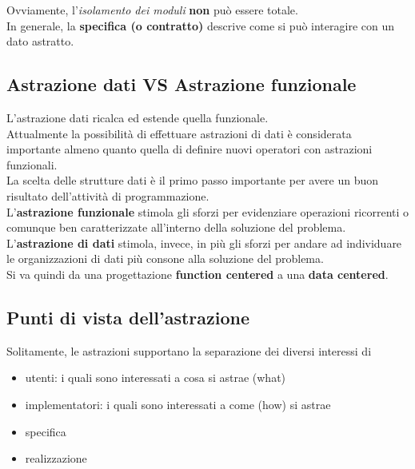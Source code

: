 \documentclass{article}
\begin{document}
	Ovviamente, l'\textit{isolamento dei moduli} \textbf{non} può essere totale. \\
	In generale, la \textbf{specifica (o contratto)} descrive come si può interagire con un dato astratto.
	
	\subsection{Astrazione dati VS Astrazione funzionale}
	L'astrazione dati ricalca ed estende quella funzionale. \\
	Attualmente la possibilità di effettuare astrazioni di dati è considerata importante almeno quanto quella di definire nuovi operatori con astrazioni funzionali. \\
	La scelta delle strutture dati è il primo passo importante per avere un buon risultato dell'attività di programmazione.
	\vspace{\baselineskip} \\
	L'\textbf{astrazione funzionale} stimola gli sforzi per evidenziare operazioni ricorrenti o comunque ben caratterizzate all'interno della soluzione del problema.
	\vspace{\baselineskip} \\
	L'\textbf{astrazione di dati} stimola, invece, in più gli sforzi per andare ad individuare le organizzazioni di dati più consone alla soluzione del problema.
	\vspace{\baselineskip} \\
	Si va quindi da una progettazione \textbf{function centered} a una \textbf{data centered}.
	
	\subsection{Punti di vista dell'astrazione}
	Solitamente, le astrazioni supportano la separazione dei diversi interessi di
	\begin{itemize}
		\item utenti: i quali sono interessati a cosa si astrae (what)
		\item implementatori: i quali sono interessati a come (how) si astrae
		\item specifica
		\item realizzazione
	\end{itemize}
	
\end{document}
